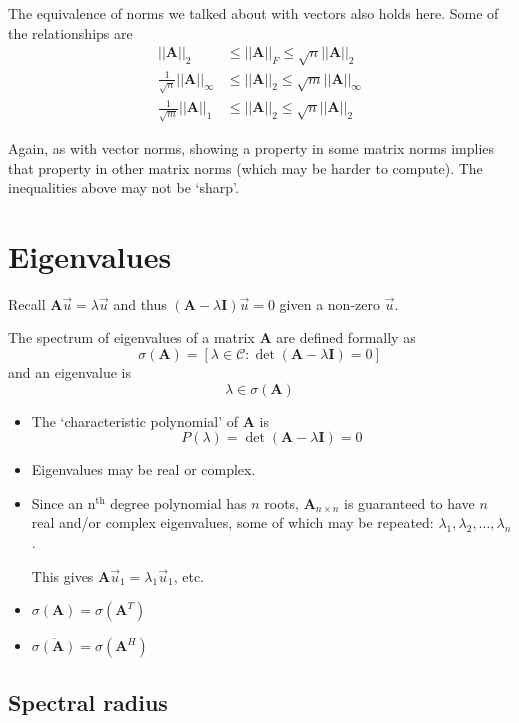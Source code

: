 \documentclass[12pt]{article}
\newcommand{\nth}{n\ensuremath{^{\text{th}}} }
\newcommand{\ve}[1]{\ensuremath{\mathbf{#1}}}
\newcommand{\cc}[1]{\ensuremath{\overline{#1}}}
\begin{document}
The equivalence of norms we talked about with vectors also holds here. Some of the relationships are
%
\begin{align}
||\ve{A}||_{2} &\leq ||\ve{A}||_{F} \leq \sqrt{n}||\ve{A}||_{2} \nonumber \\
%
\frac{1}{\sqrt{n}}||\ve{A}||_{\infty} &\leq ||\ve{A}||_{2} \leq \sqrt{m}||\ve{A}||_{\infty} \nonumber \\
%
\frac{1}{\sqrt{m}}||\ve{A}||_{1} &\leq ||\ve{A}||_{2} \leq \sqrt{n}||\ve{A}||_{2} \nonumber
\end{align}

Again, as with vector norms, showing a property in some matrix norms implies that property in other matrix norms (which may be harder to compute). The inequalities above may not be `sharp'.

\section{Eigenvalues}

Recall $\ve{A} \vec{u} = \lambda \vec{u}$ and thus $(\ve{A} - \lambda \ve{I}) \vec{u}=0$ given a non-zero $\vec{u}$.

The spectrum of eigenvalues of a matrix $\ve{A}$ are defined formally as
\[\sigma(\ve{A}) = [ \lambda \in \mathcal{C} : \det(\ve{A} - \lambda \ve{I})=0] \] 
and an eigenvalue is 
\[ \lambda \in \sigma(\ve{A}) \]
%
\begin{itemize}
\item The `characteristic polynomial' of $\ve{A}$ is
\[P(\lambda) = \det(\ve{A} - \lambda \ve{I}) = 0\]
\item Eigenvalues may be real or complex. 
\item Since an \nth degree polynomial has $n$ roots, $\ve{A}_{n \times n}$ is guaranteed to have $n$ real and/or complex eigenvalues, some of which may be repeated: $\lambda_1, \lambda_2, \dots, \lambda_n$.

This gives $\ve{A}\vec{u}_1 = \lambda_1 \vec{u}_1$, etc.
\item $\sigma(\ve{A}) = \sigma(\ve{A}^T)$
\item $\cc{\sigma(\ve{A})} = \sigma(\ve{A}^H)$
\end{itemize}

\subsection{Spectral radius} 
\end{document}
